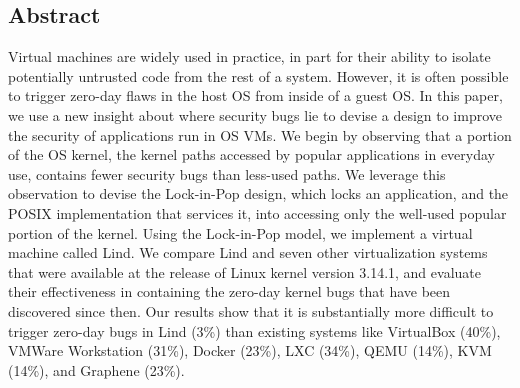 \subsection*{Abstract}
Virtual machines are widely used in practice, in part for their ability to
isolate potentially untrusted code from the rest of a system.
However, it is often possible to trigger zero-day flaws
in the host OS from inside of a guest OS.  %
In this paper, we use a new insight about where security bugs lie to devise a design to improve the security of applications
run in OS VMs.
We begin by observing that a portion of the OS kernel, the kernel paths accessed
by popular applications in everyday use, contains fewer security bugs than less-used paths. We
leverage this observation to devise the Lock-in-Pop design, which
locks an application, and the POSIX implementation that services it, into
accessing only the well-used popular portion of the kernel.  Using the Lock-in-Pop model, we
implement a virtual machine called Lind.
We compare Lind and seven other virtualization systems that were
available at the release of Linux kernel version 3.14.1, and evaluate
their effectiveness in containing the zero-day kernel bugs that have been discovered
since then.
Our results show that it is substantially more difficult to trigger zero-day bugs in
Lind (3\%) than existing systems like VirtualBox (40\%), VMWare Workstation
(31\%), Docker (23\%), LXC (34\%), QEMU (14\%), KVM (14\%), and Graphene (23\%).
